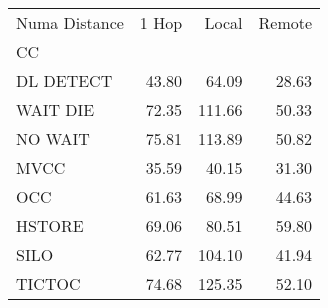 \begin{tabular}{lrrr}
\toprule
Numa Distance &  1 Hop &  Local &  Remote \\
CC        &        &        &         \\
\midrule
DL DETECT &  43.80 &  64.09 &   28.63 \\
WAIT DIE  &  72.35 & 111.66 &   50.33 \\
NO WAIT   &  75.81 & 113.89 &   50.82 \\
MVCC      &  35.59 &  40.15 &   31.30 \\
OCC       &  61.63 &  68.99 &   44.63 \\
HSTORE    &  69.06 &  80.51 &   59.80 \\
SILO      &  62.77 & 104.10 &   41.94 \\
TICTOC    &  74.68 & 125.35 &   52.10 \\
\bottomrule
\end{tabular}
